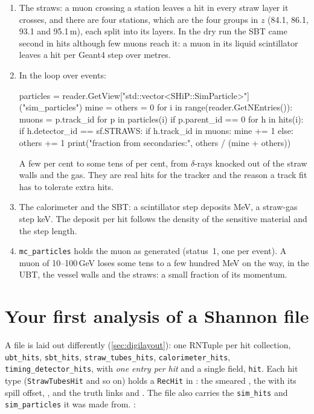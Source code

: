 \begin{solution}
\begin{enumerate}
  \item The straws: a muon crossing a station leaves a hit in every straw
        layer it crosses, and there are four stations, which are the four
        groups in $z$ (84.1, 86.1, 93.1 and 95.1\,m), each split into its
        layers. In the dry run the SBT came second in hits although few
        muons reach it: a muon in its liquid scintillator leaves a hit per
        Geant4 step over metres.
  \item In the loop over events:
\begin{py}
particles = reader.GetView["std::vector<SHiP::SimParticle>"]("sim_particles")
mine = others = 0
for i in range(reader.GetNEntries()):
    muons = {p.track_id for p in particles(i) if p.parent_id == 0}
    for h in hits(i):
        if h.detector_id == sf.STRAWS:
            if h.track_id in muons:
                mine += 1
            else:
                others += 1
print("fraction from secondaries:", others / (mine + others))
\end{py}
        A few per cent to some tens of per cent, from $\delta$-rays knocked out
        of the straw walls and the gas. They are real hits for the tracker
        and the reason a track fit has to tolerate extra hits.
  \item The calorimeter and the SBT: a scintillator step deposits MeV, a
        straw-gas step keV. The deposit per hit follows the density of the
        sensitive material and the step length.
  \item \texttt{mc\_particles} holds the muon as generated (status~1, one
        per event). A muon of 10--100\,GeV loses some tens to a few hundred MeV
        on the way, in the UBT, the vessel walls and the straws: a small
        fraction of its momentum.
\end{enumerate}
\end{solution}

\section{Your first analysis of a Shannon file}
\label{sec:firstdigi}

A  file is laid out differently (\cref{sec:digilayout}): one
RNTuple per hit collection, \texttt{ubt\_hits}, \texttt{sbt\_hits},
\texttt{straw\_tubes\_hits}, \texttt{calorimeter\_hits},
\texttt{timing\_detector\_hits}, with \emph{one entry per hit} and a single
field, \texttt{hit}. Each hit type (\texttt{StrawTubesHit} and so on) holds a
\texttt{RecHit} in : the smeared , the
 with its spill offset, , and the truth
links  and . The file also carries the
\texttt{sim\_hits} and \texttt{sim\_particles} it was made from.
:

